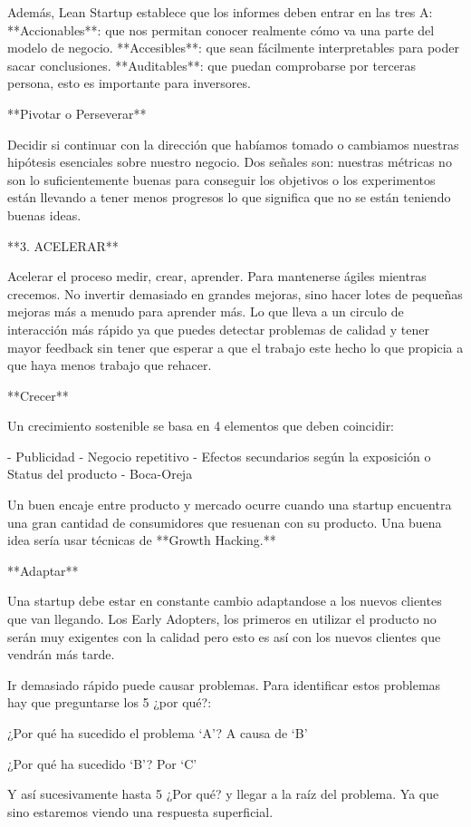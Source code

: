 \documentclass[12pt,twoside,titlepage]{report}
\begin{document}
Además, Lean Startup establece que los informes deben entrar en las tres A: **Accionables**: que nos permitan conocer realmente cómo va una parte del modelo de negocio. **Accesibles**: que sean fácilmente interpretables para poder sacar conclusiones. **Auditables**: que puedan comprobarse por terceras persona, esto es importante para inversores.

**Pivotar o Perseverar**

Decidir si continuar con la dirección que habíamos tomado o cambiamos nuestras hipótesis esenciales sobre nuestro negocio. Dos señales son: nuestras métricas no son lo suficientemente buenas para conseguir los objetivos o los experimentos están llevando a tener menos progresos lo que significa que no se están teniendo buenas ideas.

**3. ACELERAR**

Acelerar el proceso medir, crear, aprender. Para mantenerse ágiles mientras crecemos. No invertir demasiado en grandes mejoras, sino hacer lotes de pequeñas mejoras más a menudo para aprender más. Lo que lleva a un circulo de interacción más rápido ya que puedes detectar problemas de calidad y tener mayor feedback sin tener que esperar a que el trabajo este hecho lo que propicia a que haya menos trabajo que rehacer.

**Crecer**

Un crecimiento sostenible se basa en 4 elementos que deben coincidir: 

- Publicidad
- Negocio repetitivo
- Efectos secundarios según la exposición o Status del producto
- Boca-Oreja

Un buen encaje entre producto y mercado ocurre cuando una startup encuentra una gran cantidad de consumidores que resuenan con su producto. Una buena idea sería usar técnicas de **Growth Hacking.**

**Adaptar**

Una startup debe estar en constante cambio adaptandose a los nuevos clientes que van llegando. Los Early Adopters, los primeros en utilizar el producto no serán muy exigentes con la calidad pero esto es así con los nuevos clientes que vendrán más tarde.

Ir demasiado rápido puede causar problemas. Para identificar estos problemas hay que preguntarse los 5 ¿por qué?:

¿Por qué ha sucedido el problema ‘A’? A causa de ‘B’

¿Por qué ha sucedido ‘B’? Por ‘C’

Y así sucesivamente hasta 5 ¿Por qué? y llegar a la raíz del problema. Ya que sino estaremos viendo una respuesta superficial.
\end{document}
